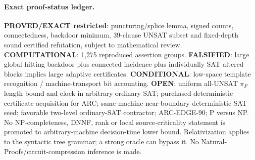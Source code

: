 \documentclass[11pt]{article}
\begin{document}
\paragraph{Exact proof-status ledger.}\textbf{PROVED/EXACT restricted}: puncturing/splice lemma, signed counts, connectedness, backdoor minimum, 39-clause UNSAT subset and fixed-depth sound certified refutation, subject to mathematical review. \textbf{COMPUTATIONAL}: 1,275 reproduced assertion groups. \textbf{FALSIFIED}: large global hitting backdoor plus connected incidence plus individually SAT altered blocks implies large adaptive certificates. \textbf{CONDITIONAL}: low-space template recognition / machine-transport bit accounting. \textbf{OPEN}: uniform all-UNSAT $\pi_F$ length bound and clock in arbitrary ordinary SAT; purchased deterministic certificate acquisition for ARC; same-machine near-boundary deterministic SAT seed; favorable two-level ordinary-SAT contractor; ARC-EDGE-90; P versus NP. No NP-completeness, DNNF, rank or local source-criticality statement is promoted to arbitrary-machine decision-time lower bound. Relativization applies to the syntactic tree grammar; a strong oracle can bypass it. No Natural-Proofs/circuit-compression inference is made.
\end{document}
